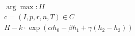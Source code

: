 \documentclass[43pt]{jsarticle}
\begin{document}
$$\begin{array}{c}
\arg \max : I I \\
\mathrm{c}=(I, p, r, n, T) \in C \\
H-k \cdot \exp \left(\alpha h_{0}-\beta h_{1}+\gamma\left(h_{2}-h_{3}\right)\right)
\end{array}$$
\end{document}
